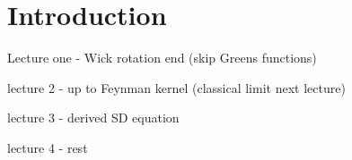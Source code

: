 \chapter{Introduction}


Lecture one - Wick rotation end  (skip Greens functions)

lecture 2 - up to Feynman kernel (classical limit next lecture) 

lecture 3 - derived SD equation 

lecture 4 - rest 